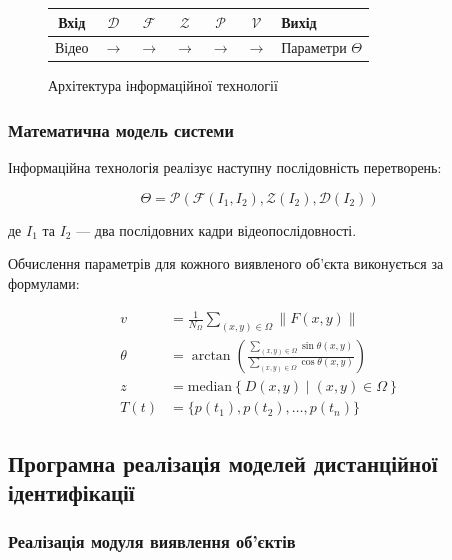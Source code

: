 \documentclass[14pt, a4paper]{extarticle}
\numberwithin{equation}{section}
\begin{document}
\begin{figure}[H]
\centering
\begin{tabular}{|c|c|c|c|c|c|}
\hline
\textbf{Вхід} & $\mathcal{D}$ & $\mathcal{F}$ & $\mathcal{Z}$ & $\mathcal{P}$ & $\mathcal{V}$ & \textbf{Вихід} \\
\hline
Відео & $\rightarrow$ & $\rightarrow$ & $\rightarrow$ & $\rightarrow$ & $\rightarrow$ & Параметри $\Theta$ \\
\hline
\end{tabular}
\caption{Архітектура інформаційної технології}
\label{fig:arch}
\end{figure}

\subsubsection{Математична модель системи}

Інформаційна технологія реалізує наступну послідовність перетворень:

\begin{equation}
\Theta = \mathcal{P}\left(\mathcal{F}(I_1, I_2), \mathcal{Z}(I_2), \mathcal{D}(I_2)\right) \tag{4.2}
\end{equation}

де $I_1$ та $I_2$ — два послідовних кадри відеопослідовності.

Обчислення параметрів для кожного виявленого об'єкта виконується за формулами:

\begin{align}
v &= \frac{1}{N_\Omega} \sum_{(x,y) \in \Omega} \|F(x,y)\| \tag{4.3} \\
\theta &= \arctan\left( \frac{\sum_{(x,y) \in \Omega} \sin\theta(x,y)}{\sum_{(x,y) \in \Omega} \cos\theta(x,y)} \right) \tag{4.4} \\
z &= \text{median}\left\{ D(x,y) \mid (x,y) \in \Omega \right\} \tag{4.5} \\
T(t) &= \{p(t_1), p(t_2), \ldots, p(t_n)\} \tag{4.6}
\end{align}

\subsection{Програмна реалізація моделей дистанційної ідентифікації}

\subsubsection{Реалізація модуля виявлення об'єктів}
\end{document}
